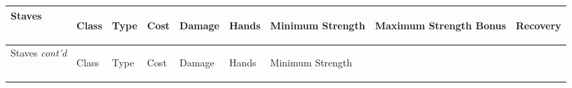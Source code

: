\documentclass[twoside]{book}
\begin{document}
\begin{longtable}{p{1.25in}llllp{2em}p{3em}p{3em}l} 
  Staves
  &
  \begin{turn}{70}{Class}\end{turn}
          
  &
  \begin{turn}{70}{Type}\end{turn}
          
  &
  \begin{turn}{70}{Cost}\end{turn}
          
  &
  \begin{turn}{70}{Damage}\end{turn}
          
  &
  \begin{turn}{70}{Hands}\end{turn}
          
  &
  \begin{turn}{70}{Minimum Strength}\end{turn}
          
  &
  \begin{turn}{70}{Maximum Strength Bonus}\end{turn}
          
  &
  \begin{turn}{70}{Recovery}\end{turn}
          
  \\
  \hline
  \hline
  \endfirsthead
  Staves \textit{cont'd}
        
  &
  \begin{turn}{70}{Class}\end{turn}
          
  &
  \begin{turn}{70}{Type}\end{turn}
          
  &
  \begin{turn}{70}{Cost}\end{turn}
          
  &
  \begin{turn}{70}{Damage}\end{turn}
          
  &
  \begin{turn}{70}{Hands}\end{turn}
          
  &
  \begin{turn}{70}{Minimum Strength}\end{turn}
          

\end{longtable}
\end{document}
